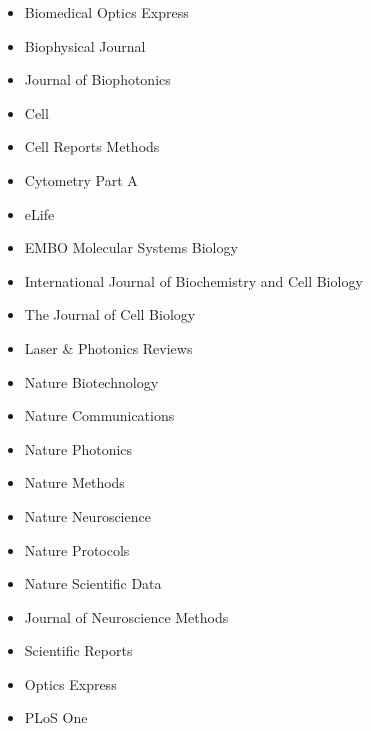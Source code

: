 \begin{itemize}
\item Biomedical Optics Express
\item Biophysical Journal
\item Journal of Biophotonics
\item Cell
\item Cell Reports Methods
\item Cytometry Part A
\item eLife
\item EMBO Molecular Systems Biology 
\item International Journal of Biochemistry and Cell Biology
\item The Journal of Cell Biology
\item Laser \& Photonics Reviews
\item Nature Biotechnology
\item Nature Communications
\item Nature Photonics
\item Nature Methods
\item Nature Neuroscience
\item Nature Protocols
\item Nature Scientific Data
\item Journal of Neuroscience Methods
\item Scientific Reports
\item Optics Express
\item PLoS One
\end{itemize}